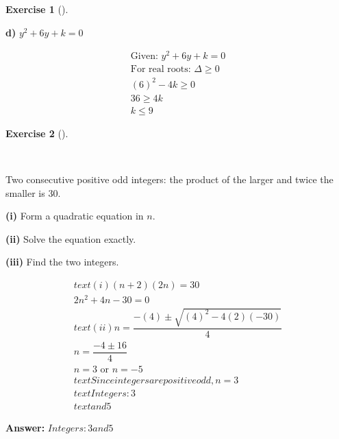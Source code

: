 \documentclass[
  letterpaper,
  DIV=11,
  numbers=noendperiod]{scrreprt}
\theoremstyle{definition}
\newtheorem{exercise}{Exercise}[chapter]
\theoremstyle{remark}
\begin{document}
\begin{exercise}[]
\begin{tcolorbox}
\textbf{d)} \(\displaystyle y^2 + 6y + k = 0\)

\begin{align*}
\text{Given: } y^2 + 6y + k = 0 \\ \text{For real roots: } \Delta \geq 0 \\ (6)^2 - 4k \geq 0 \\ 36 \geq 4k \\ k \leq 9
\end{align*}

\end{tcolorbox}

\end{exercise}

\begin{exercise}[]\protect\hypertarget{exr-u6-26-1}{}\label{exr-u6-26-1}

~

Two consecutive positive odd integers: the product of the larger and
twice the smaller is 30.

\textbf{(i)} Form a quadratic equation in \(n\).

\textbf{(ii)} Solve the equation exactly.

\textbf{(iii)} Find the two integers.

\begin{tcolorbox}[enhanced jigsaw, opacitybacktitle=0.6, coltitle=black, arc=.35mm, colframe=quarto-callout-tip-color-frame, colback=white, bottomrule=.15mm, left=2mm, colbacktitle=quarto-callout-tip-color!10!white, titlerule=0mm, opacityback=0, title=\textcolor{quarto-callout-tip-color}{\faLightbulb}\hspace{0.5em}{🔍 View Solution}, leftrule=.75mm, breakable, rightrule=.15mm, bottomtitle=1mm, toptitle=1mm, toprule=.15mm]

\begin{align*}
text{(i) } (n+2)(2n) = 30 \\ 2n^2 + 4n - 30 = 0 \\ text{(ii) } n = \dfrac{-(4) \pm \sqrt{(4)^2 - 4(2)(-30)}}{4} \\ n = \dfrac{-4 \pm 16}{4} \\ n = 3 \text{ or } n = -5 \\ text{Since integers are positive odd, } n = 3 \\ text{Integers: } 3 \\ text{ and } 5
\end{align*}

\textbf{Answer:} \(Integers: 3 and 5\)

\end{tcolorbox}

\end{exercise}
\end{document}
